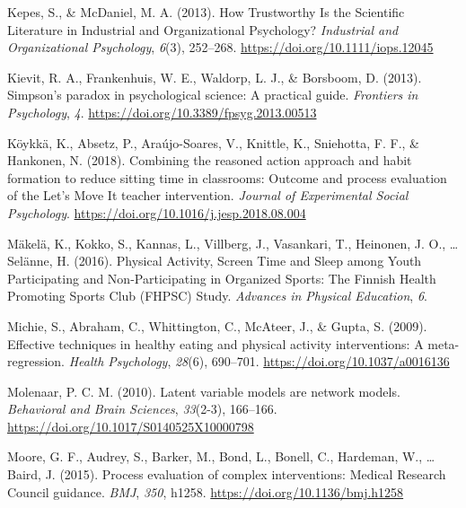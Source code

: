 \documentclass[british,man]{apa6}
\begin{document}
\leavevmode\hypertarget{ref-kepesHowTrustworthyScientific2013}{}%
Kepes, S., \& McDaniel, M. A. (2013). How Trustworthy Is the Scientific Literature in Industrial and Organizational Psychology? \emph{Industrial and Organizational Psychology}, \emph{6}(3), 252--268. \url{https://doi.org/10.1111/iops.12045}

\leavevmode\hypertarget{ref-kievitSimpsonParadoxPsychological2013}{}%
Kievit, R. A., Frankenhuis, W. E., Waldorp, L. J., \& Borsboom, D. (2013). Simpson's paradox in psychological science: A practical guide. \emph{Frontiers in Psychology}, \emph{4}. \url{https://doi.org/10.3389/fpsyg.2013.00513}

\leavevmode\hypertarget{ref-koykkaCombiningReasonedAction2018}{}%
Köykkä, K., Absetz, P., Araújo-Soares, V., Knittle, K., Sniehotta, F. F., \& Hankonen, N. (2018). Combining the reasoned action approach and habit formation to reduce sitting time in classrooms: Outcome and process evaluation of the Let's Move It teacher intervention. \emph{Journal of Experimental Social Psychology}. \url{https://doi.org/10.1016/j.jesp.2018.08.004}

\leavevmode\hypertarget{ref-makelaPhysicalActivityScreen2016}{}%
Mäkelä, K., Kokko, S., Kannas, L., Villberg, J., Vasankari, T., Heinonen, J. O., \ldots{} Selänne, H. (2016). Physical Activity, Screen Time and Sleep among Youth Participating and Non-Participating in Organized Sports: The Finnish Health Promoting Sports Club (FHPSC) Study. \emph{Advances in Physical Education}, \emph{6}.

\leavevmode\hypertarget{ref-michieEffectiveTechniquesHealthy2009}{}%
Michie, S., Abraham, C., Whittington, C., McAteer, J., \& Gupta, S. (2009). Effective techniques in healthy eating and physical activity interventions: A meta-regression. \emph{Health Psychology}, \emph{28}(6), 690--701. \url{https://doi.org/10.1037/a0016136}

\leavevmode\hypertarget{ref-molenaarLatentVariableModels2010}{}%
Molenaar, P. C. M. (2010). Latent variable models are network models. \emph{Behavioral and Brain Sciences}, \emph{33}(2-3), 166--166. \url{https://doi.org/10.1017/S0140525X10000798}

\leavevmode\hypertarget{ref-mooreProcessEvaluationComplex2015}{}%
Moore, G. F., Audrey, S., Barker, M., Bond, L., Bonell, C., Hardeman, W., \ldots{} Baird, J. (2015). Process evaluation of complex interventions: Medical Research Council guidance. \emph{BMJ}, \emph{350}, h1258. \url{https://doi.org/10.1136/bmj.h1258}
\end{document}
